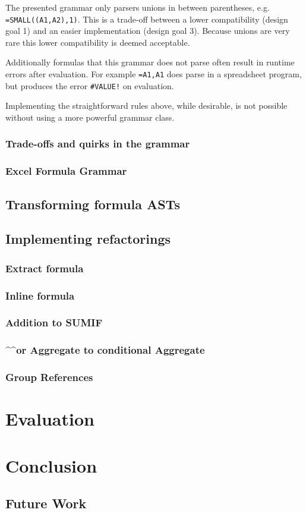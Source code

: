 \documentclass[12pt,a4paper,onecolumn,oneside]{memoir}
\begin{document}
The presented grammar only parsers unions in between parentheses, e.g. \texttt{=SMALL((A1,A2),1)}.
This is a trade-off between a lower compatibility (design goal 1) and an easier implementation (design goal 3).
Because unions are very rare \cite{grammarpaper} this lower compatibility is deemed acceptable.

Additionally formulas that this grammar does not parse often result in runtime errors after evaluation.
For example \texttt{=A1,A1} does parse in a spreadsheet program, but produces the error \texttt{\#VALUE!} on evaluation.

Implementing the straightforward rules above, while desirable, is not possible without using a more powerful grammar class.


\subsection{Trade-offs and quirks in the grammar}

\subsection{Excel Formula Grammar}

\section{Transforming formula ASTs}

\section{Implementing refactorings}

\subsection{Extract formula}

\subsection{Inline formula}

\subsection{Addition to SUMIF}

\subsection{\textasciicircum\textasciicircum or Aggregate to conditional Aggregate}

\subsection{Group References}

\chapter{Evaluation}


\chapter{Conclusion}

\section{Future Work}



\end{document}
